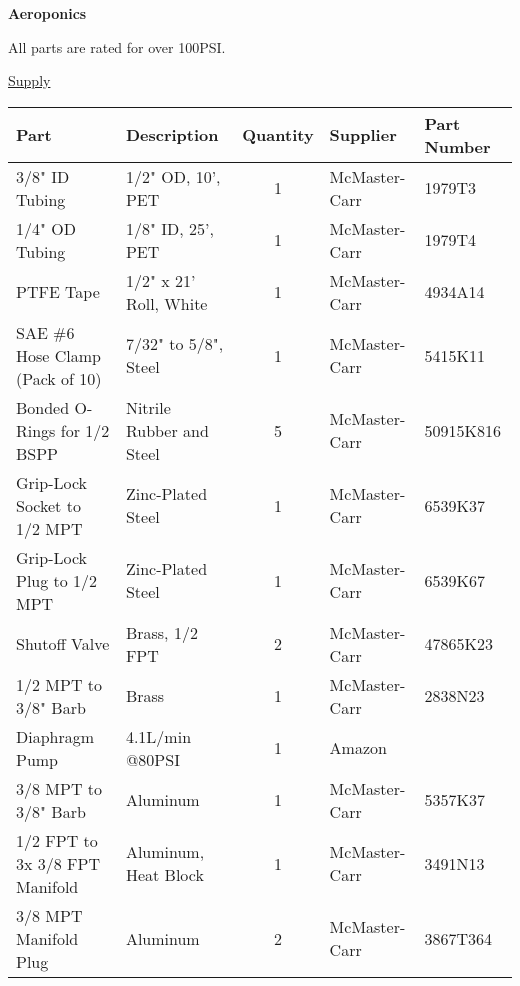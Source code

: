 \clearpage

\textbf{Aeroponics}

All parts are rated for over 100PSI.

\uline{Supply}
\begin{table}[!ht]
    \centering
    \begin{tabular}{|l|l|c|l|l|}
    \hline
        Part                            & Description               & Quantity  & Supplier              & Part Number   \\ \hline
        3/8" ID Tubing                  & 1/2" OD, 10', PET         & 1         & McMaster-Carr         & 1979T3        \\ \hline
        1/4" OD Tubing                  & 1/8" ID, 25', PET         & 1         & McMaster-Carr         & 1979T4        \\ \hline
        PTFE Tape                       & 1/2" x 21' Roll, White    & 1         & McMaster-Carr         & 4934A14       \\ \hline
        SAE \#6 Hose Clamp (Pack of 10) & 7/32" to 5/8", Steel      & 1         & McMaster-Carr         & 5415K11       \\ \hline
        Bonded O-Rings for 1/2 BSPP     & Nitrile Rubber and Steel  & 5         & McMaster-Carr         & 50915K816     \\ \hline
        Grip-Lock Socket to 1/2 MPT     & Zinc-Plated Steel         & 1         & McMaster-Carr         & 6539K37       \\ \hline
        Grip-Lock Plug to 1/2 MPT       & Zinc-Plated Steel         & 1         & McMaster-Carr         & 6539K67       \\ \hline
        Shutoff Valve                   & Brass, 1/2 FPT            & 2         & McMaster-Carr         & 47865K23      \\ \hline
        1/2 MPT to 3/8" Barb            & Brass                     & 1         & McMaster-Carr         & 2838N23       \\ \hline
        Diaphragm Pump                  & 4.1L/min @80PSI           & 1         & Amazon                & ~             \\ \hline
        3/8 MPT to 3/8" Barb            & Aluminum                  & 1         & McMaster-Carr         & 5357K37       \\ \hline
        1/2 FPT to 3x 3/8 FPT Manifold  & Aluminum, Heat Block      & 1         & McMaster-Carr         & 3491N13       \\ \hline
        3/8 MPT Manifold Plug           & Aluminum                  & 2         & McMaster-Carr         & 3867T364      \\ \hline

\end{tabular}
\end{table}
